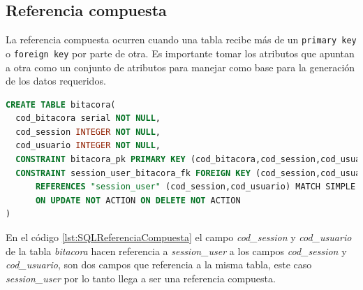 \subsection{Referencia compuesta}
La referencia compuesta ocurren cuando una tabla recibe m\'as de un \texttt{primary key} o \texttt{foreign key} por parte de otra. Es importante tomar los atributos que apuntan a otra como un conjunto de atributos para manejar como base para la generaci\'on de los datos requeridos.
\begin{lstlisting}[caption={Referencia compuesta},label={lst:SQLReferenciaCompuesta},language=sql]
CREATE TABLE bitacora(
  cod_bitacora serial NOT NULL,
  cod_session INTEGER NOT NULL,
  cod_usuario INTEGER NOT NULL,	  
  CONSTRAINT bitacora_pk PRIMARY KEY (cod_bitacora,cod_session,cod_usuario),
  CONSTRAINT session_user_bitacora_fk FOREIGN KEY (cod_session,cod_usuario)
      REFERENCES "session_user" (cod_session,cod_usuario) MATCH SIMPLE
      ON UPDATE NOT ACTION ON DELETE NOT ACTION
)
\end{lstlisting}
En el c\'odigo \ref{lst:SQLReferenciaCompuesta} el campo \textit{cod\_session} y \textit{cod\_usuario} de la tabla \textit{bitacora} hacen referencia a \textit{session\_user} a los campos \textit{cod\_session} y \textit{cod\_usuario}, son dos campos que referencia a la misma tabla, este caso \textit{session\_user} por lo tanto llega a ser una referencia compuesta.